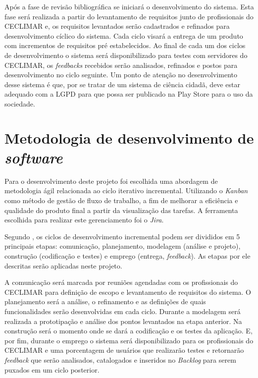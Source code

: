 Após a fase de revisão bibliográfica se iniciará o desenvolvimento do sistema. Esta fase será realizada a 
partir do levantamento de requisitos junto de profissionais do CECLIMAR e, os requisitos levantados serão 
cadastrados e refinados para desenvolvimento cíclico do sistema. Cada ciclo visará a entrega de um produto 
com incrementos de requisitos pré estabelecidos. Ao final de cada um dos ciclos de desenvolvimento o sistema 
será disponibilizado para testes com servidores do CECLIMAR, os \textit{feedbacks} recebidos serão analisados, 
refinados e postos para desenvolvimento no ciclo seguinte. Um ponto de atenção no desenvolvimento desse 
sistema é que, por se tratar de um sistema de ciência cidadã, deve estar adequado com a LGPD para que possa 
ser publicado na Play Store para o uso da sociedade.

\section{Metodologia de desenvolvimento de \textit{software}}\label{sec:metodologia-desenv-software}

Para o desenvolvimento deste projeto foi escolhida uma abordagem de metodologia ágil relacionada 
ao ciclo iterativo incremental. Utilizando o \textit{Kanban} como método de gestão de fluxo de trabalho, a 
fim de melhorar a eficiência e qualidade do produto final a partir da visualização das tarefas. A 
ferramenta escolhida para realizar este gerenciamento foi o \textit{Jira}.

Segundo , os ciclos de desenvolvimento incremental podem ser 
divididos em 5 principais etapas: comunicação, planejamento, modelagem (análise e projeto), construção 
(codificação e testes) e emprego (entrega, \textit{feedback}). As etapas por ele descritas serão 
aplicadas neste projeto.

A comunicação será marcada por reuniões agendadas com os profissionais do CECLIMAR para definição de
 escopo e levantamento de requisitos do sistema. O planejamento será a análise, o refinamento e as 
 definições de quais funcionalidades serão desenvolvidas em cada ciclo. Durante a modelagem será 
 realizada a prototipação e análise dos pontos levantados na etapa anterior. Na construção será o 
 momento onde se dará a codificação e os testes da aplicação. E, por fim, durante o emprego o sistema 
 será disponibilizado para os profissionais do CECLIMAR e uma porcentagem de usuários que realizarão 
 testes e retornarão \textit{feedback} que serão analisados, catalogados e inseridos no \textit{Backlog} 
 para serem puxados em um ciclo posterior.


